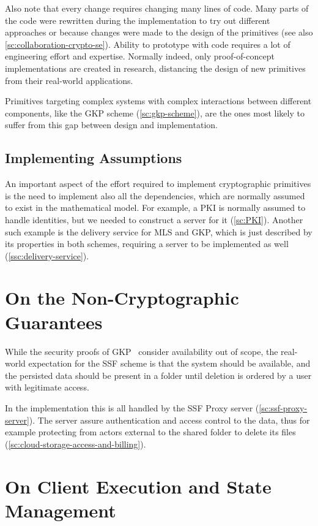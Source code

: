 Also note that every change requires
changing many lines of code. Many parts of the code
were rewritten during the implementation to try out
different approaches or because changes were made to the
design of the primitives (see also \cref{sc:collaboration-crypto-se}). 
Ability to prototype with
code requires a lot of engineering effort and
expertise. Normally indeed, only proof-of-concept
implementations are created in research,
distancing the design of new primitives from their
real-world applications.

Primitives targeting complex systems with complex interactions
between different components, like the GKP scheme (\cref{sc:gkp-scheme}), are the
ones most likely to suffer from this gap between design
and implementation.

\subsection{Implementing Assumptions}\label{sc:implementing-assumptions}

An important aspect of the effort required to implement
cryptographic primitives is the need to implement also
all the dependencies, which are normally assumed to exist
in the mathematical model. For example, a PKI is normally
assumed to handle identities, but we needed to construct a server for it (\cref{sc:PKI}).
Another such example is the delivery service for MLS and
GKP, which is just described by its properties in both schemes,
requiring a server to be implemented as well (\cref{ssc:delivery-service}).

\section{On the Non-Cryptographic Guarantees}\label{sc:gap-non-crypto-guarantees}

While the security proofs of GKP~\cite{GKP} consider availability out of
scope, the real-world expectation for the SSF scheme
is that the system should be
available, and the persisted data should be present in 
a folder until deletion is ordered by a user with
legitimate access.

In the implementation this is all handled by the SSF Proxy server
(\cref{sc:ssf-proxy-server}).
The server assure authentication and access control
to the data, thus for example protecting from actors 
external to the shared folder to delete its files (\cref{sc:cloud-storage-access-and-billing}). 

\section{On Client Execution and State Management}\label{sc:gap-execution-multi-tenancy-state-management}

